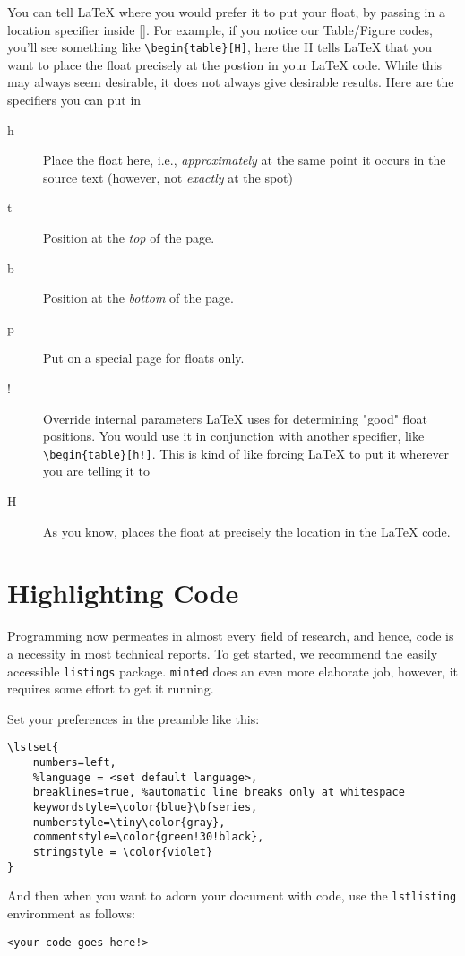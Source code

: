 \documentclass[12pt, letterpaper]{article}
\theoremstyle{remark}
\begin{document}
You can tell \LaTeX{} where you would prefer it to put your float, by passing in a location specifier inside []. For example, if you notice our Table/Figure codes, you'll see something like \verb!\begin{table}[H]!, here the H tells \LaTeX{} that you want to place the float precisely at the postion in your \LaTeX{} code. While this may always seem desirable, it does not always give desirable results. Here are the specifiers you can put in
\begin{description}
    \item[h] Place the float here, i.e., \textit{approximately} at the same point it occurs in the source text (however, not \textit{exactly} at the spot)
    \item[t] Position at the \textit{top} of the page.
    \item[b] Position at the \textit{bottom} of the page.
    \item[p] Put on a special page for floats only.
    \item[!] Override internal parameters LaTeX uses for determining "good" float positions. You would use it in conjunction with another specifier, like \verb|\begin{table}[h!]|. This is kind of like forcing \LaTeX{} to put it wherever you are telling it to
    \item[H] As you know, places the float at precisely the location in the LaTeX code.
\end{description}

\section{Highlighting Code}
Programming now permeates in almost every field of research, and hence, code is a necessity in most technical reports. To get started, we recommend the easily accessible \verb!listings! package. \verb!minted! does an even more elaborate job, however, it requires some effort to get it running.

Set your preferences in the preamble like this:
\begin{lstlisting}
\lstset{
    numbers=left,
    %language = <set default language>,
    breaklines=true, %automatic line breaks only at whitespace
    keywordstyle=\color{blue}\bfseries, 
    numberstyle=\tiny\color{gray},
    commentstyle=\color{green!30!black},
    stringstyle = \color{violet}
}
\end{lstlisting}

And then when you want to adorn your document with code, use the \verb!lstlisting! environment as follows:
\begin{TeXlstlisting}
\begin{lstlisting}[language=<the programming language>]
<your code goes here!>
\end{lstlisting}
\end{TeXlstlisting}
\end{document}
